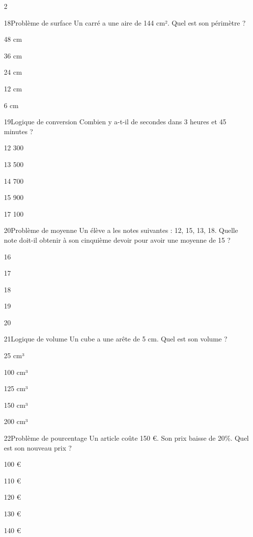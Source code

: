 \begin{multicols}{2}
\begin{question}{18}{Problème de surface}
Un carré a une aire de 144 cm². Quel est son périmètre ?
\begin{enumeratebf}
\item 48 cm
\item 36 cm
\item 24 cm
\item 12 cm
\item 6 cm
\end{enumeratebf}
\end{question}

\begin{question}{19}{Logique de conversion}
Combien y a-t-il de secondes dans 3 heures et 45 minutes ?
\begin{enumeratebf}
\item 12 300
\item 13 500
\item 14 700
\item 15 900
\item 17 100
\end{enumeratebf}
\end{question}

\begin{question}{20}{Problème de moyenne}
Un élève a les notes suivantes : 12, 15, 13, 18. Quelle note doit-il obtenir à son cinquième devoir pour avoir une moyenne de 15 ?
\begin{enumeratebf}
\item 16
\item 17
\item 18
\item 19
\item 20
\end{enumeratebf}
\end{question}

\begin{question}{21}{Logique de volume}
Un cube a une arête de 5 cm. Quel est son volume ?
\begin{enumeratebf}
\item 25 cm³
\item 100 cm³
\item 125 cm³
\item 150 cm³
\item 200 cm³
\end{enumeratebf}
\end{question}

\begin{question}{22}{Problème de pourcentage}
Un article coûte 150 €. Son prix baisse de 20\%. Quel est son nouveau prix ?
\begin{enumeratebf}
\item 100 €
\item 110 €
\item 120 €
\item 130 €
\item 140 €
\end{enumeratebf}
\end{question}


\end{multicols}
